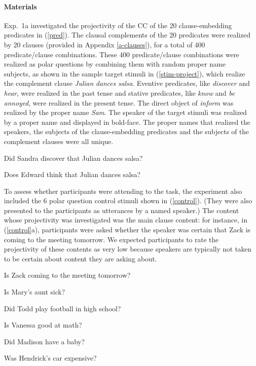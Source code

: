\documentclass[11pt,fleqn]{article}
\newcommand{\6}{\mbox{$[\hspace*{-.6mm}[$}}
\newcommand{\9}{\mbox{$]\hspace*{-.6mm}]$}}
\begin{document}
\paragraph{Materials} Exp.~1a investigated the projectivity of the CC of the 20 clause-embedding predicates in (\ref{pred}).  The clausal complements of the 20 predicates were realized by 20 clauses (provided in Appendix \ref{a-clauses}), for a total of 400 predicate/clause combinations. These 400 predicate/clause combinations were realized as polar questions by combining them with random proper name subjects, as shown in the sample target stimuli in (\ref{stim-project}), which realize the complement clause {\em Julian dances salsa}. Eventive predicates, like {\em discover} and {\em hear}, were realized in the past tense and stative predicates, like {\em know} and {\em be annoyed}, were realized in the present tense. The direct object of {\em inform} was realized by the proper name {\em Sam}.  The speaker of the target stimuli was realized by a proper name and displayed in bold-face. The proper names that realized the speakers, the subjects of the clause-embedding predicates and the subjects of the complement clauses were all unique.

\begin{exe}
\ex\label{stim-project} 
\begin{xlist}
 Did Sandra discover that Julian dances salsa?

 Does Edward think that Julian dances salsa?
\end{xlist}
\end{exe}

To assess whether participants were attending to the task, the experiment also included the 6  polar question control stimuli shown in (\ref{control}). (They were also presented to the participants as utterances by a named speaker.) The content whose projectivity was investigated was the main clause content: for instance, in (\ref{control}a), participants were asked whether the speaker was certain that Zack is coming to the meeting tomorrow. We expected participants to rate the projectivity of these contents as very low because speakers are typically not taken to be certain about content they are asking about.

\begin{exe}
\ex\label{control} 
\begin{xlist}

\ex   Is Zack coming to the meeting tomorrow?

\ex Is Mary's aunt sick?

\ex Did Todd play football in high school?

\ex Is Vanessa good at math?

\ex Did Madison have a baby?

\ex Was Hendrick's car expensive?

\end{xlist}
\end{exe}
\end{document}
